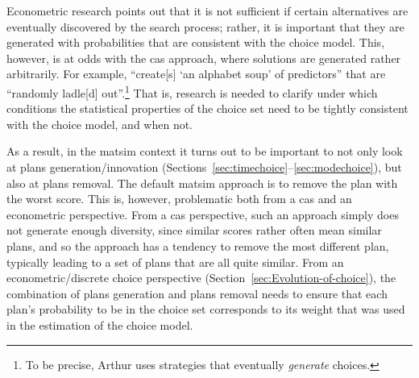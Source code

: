 Econometric research \citep[e.g.][Chapter 8 and 9]{BenAkivaLerman_1985} points out that it is not sufficient if certain alternatives are eventually discovered by the search process; rather, it is important that they are generated with %
probabilities that are consistent with the choice model.
%
This, however, is at odds with the \acrfull{cas} approach, where solutions are generated rather arbitrarily.  For example, \citet{ArthurBar} ``create[s] `an alphabet soup' of predictors'' that are ``randomly ladle[d] out''.\footnote{%
%
%
To be precise, Arthur uses strategies that eventually \emph{generate} choices.
%
}
That is, research is needed to clarify under which conditions the statistical properties of the choice set need to be tightly consistent with the choice model, and when not.


As a result, in the \gls{matsim} context it turns out to be important to not only look at plans generation/innovation (\eg Sections~\ref{sec:timechoice}--\ref{sec:modechoice}), but also at plans removal.  The default \gls{matsim} approach is to remove the plan with the worst score.  This is, however, problematic both from a \gls{cas} and an econometric perspective.  
%
From a \gls{cas} perspective, such an approach simply does not generate enough diversity, since similar scores rather often mean similar plans, and so the approach has a tendency to remove the most different plan, typically leading to a set of plans that are all quite similar.
%
From an econometric/discrete choice perspective (\cf Section~\ref{sec:Evolution-of-choice}), the combination of plans generation and plans removal needs to ensure that each plan's probability to be in the choice set corresponds to its weight that was used in the estimation of the choice model.

